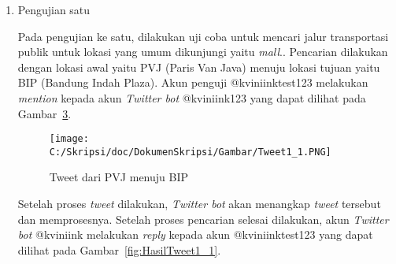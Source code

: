 \begin{enumerate}
	
	\begin{figure}
		\centering
			\texttt{[image: C:/Skripsi/doc/DokumenSkripsi/Gambar/HasilKiri1.PNG]}
		\caption{Hasil Pencarian Jalur Transportasi Publik dari BIP menuju IP Melalui Website KIRI}
		\label{fig:HasilKiri1}
	\end{figure}
	
	Lalu pencarian ke dua pada \textit{website} KIRI dilakukan dengan lokasi awal yaitu BIP dan lokasi tujuan yaitu PVJ. Hasil pencarian KIRI dari BIP menuju PVJ dapat dilihat pada Gambar~\ref{fig:HasilKiri2}. Setelah dilihat dari hasil keduanya, \textit{Twitter bot} melakukan \textit{duplicate tweet} pada \textit{tweet} pertama dalam pencarian ke dua yang dilakukan oleh akun @kviniink123. \textit{Duplicate tweet} adalah \textit{tweet} yang dinyatakan dinyatakan identik oleh Twitter dalam jangka waktu tertentu. \textit{Duplicate tweet} tidak diperbolehkan oleh Twitter. Oleh karena itu, untuk menghindari adanya \textit{duplicate tweet}, penulis menambahkan waktu untuk jam, menit, dan detik di setiap \textit{tweet} yang dilakukan oleh \textit{Twitter bot} agar membuat setiap \textit{tweet} tersebut bersifat unik.
	
	\begin{figure}
		\centering
			\texttt{[image: C:/Skripsi/doc/DokumenSkripsi/Gambar/HasilKiri2.PNG]}
		\caption{Hasil Pencarian Jalur Transportasi Publik dari BIP menuju PVJ Melalui Website KIRI}
		\label{fig:HasilKiri2}
	\end{figure}
	\clearpage
	
	\item Pengujian satu
	
	Pada pengujian ke satu, dilakukan uji coba untuk mencari jalur transportasi publik untuk lokasi yang umum dikunjungi yaitu \textit{mall}.. Pencarian dilakukan dengan lokasi awal yaitu PVJ (Paris Van Java) menuju lokasi tujuan yaitu BIP (Bandung Indah Plaza). Akun penguji @kviniinktest123 melakukan \textit{mention} kepada akun \textit{Twitter bot} @kviniink123 yang dapat dilihat pada Gambar~\ref{fig:Tweet1_1}.
	
	\begin{figure}
		\centering
			\texttt{[image: C:/Skripsi/doc/DokumenSkripsi/Gambar/Tweet1\_1.PNG]}
		\caption{Tweet dari PVJ menuju BIP}
		\label{fig:Tweet1_1}
	\end{figure}
	
	Setelah proses \textit{tweet} dilakukan, \textit{Twitter bot} akan menangkap \textit{tweet} tersebut dan memprosesnya. Setelah proses pencarian selesai dilakukan, akun \textit{Twitter bot} @kviniink melakukan \textit{reply} kepada akun @kviniinktest123 yang dapat dilihat pada Gambar~\ref{fig:HasilTweet1_1}. 
	

\end{enumerate}
